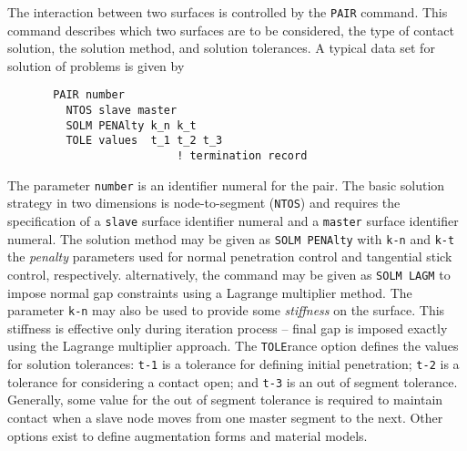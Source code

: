The interaction between two surfaces is controlled by the {\tt PAIR} command.
This command describes which two surfaces are to be considered, the type of
contact solution, the solution method, and solution tolerances.  A typical
data set for solution of problems is given by
\begin{verbatim}
       PAIR number
         NTOS slave master
         SOLM PENAlty k_n k_t
         TOLE values  t_1 t_2 t_3
                          ! termination record
\end{verbatim} 
The parameter {\tt number} is an identifier numeral for the pair.  The
basic solution strategy in two dimensions is node-to-segment ({\tt NTOS}) and
requires the specification of a {\tt slave} surface identifier numeral and
a {\tt master} surface identifier numeral.  The solution method may
be given as {\tt SOLM PENAlty} with {\tt k-n} and {\tt k-t} the {\it penalty}
parameters used for normal penetration control and tangential stick
control, respectively.  alternatively, the command may be given as
\texttt{SOLM LAGM} to impose normal gap constraints using a Lagrange multiplier
method.  The parameter \texttt{k-n} may also be used to provide some
\textit{stiffness} on the surface.  This stiffness is effective only during
iteration process -- final gap is imposed exactly using the Lagrange
multiplier approach.  The {\tt TOLE}rance option defines the values
for solution tolerances: {\tt t-1} is a tolerance for defining initial
penetration; {\tt t-2} is a tolerance for considering a contact open; and
{\tt t-3} is an out of segment tolerance.
Generally, some value for the out of segment tolerance is required to maintain
contact when a slave node moves from one master segment to the next.  Other
options exist to define augmentation forms and material models.
